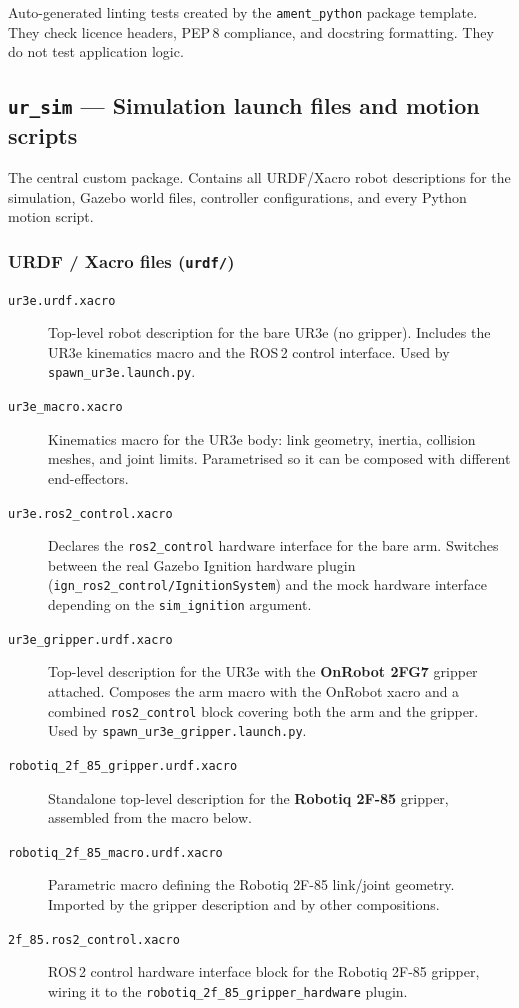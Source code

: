 \documentclass[11pt,a4paper]{article}
\newcommand{\file}[1]{\texttt{#1}}
\begin{document}
Auto-generated linting tests created by the \texttt{ament\_python} package
template. They check licence headers, PEP\,8 compliance, and docstring
formatting. They do not test application logic.

\subsection{\texttt{ur\_sim} --- Simulation launch files and motion scripts}

The central custom package. Contains all URDF/Xacro robot descriptions for
the simulation, Gazebo world files, controller configurations, and every
Python motion script.

\subsubsection{URDF / Xacro files (\file{urdf/})}

\begin{description}
  \item[\file{ur3e.urdf.xacro}]
    Top-level robot description for the bare UR3e (no gripper). Includes
    the UR3e kinematics macro and the ROS\,2 control interface. Used by
    \file{spawn\_ur3e.launch.py}.

  \item[\file{ur3e\_macro.xacro}]
    Kinematics macro for the UR3e body: link geometry, inertia, collision
    meshes, and joint limits. Parametrised so it can be composed with
    different end-effectors.

  \item[\file{ur3e.ros2\_control.xacro}]
    Declares the \texttt{ros2\_control} hardware interface for the bare arm.
    Switches between the real Gazebo Ignition hardware plugin
    (\texttt{ign\_ros2\_control/IgnitionSystem}) and the mock hardware
    interface depending on the \texttt{sim\_ignition} argument.

  \item[\file{ur3e\_gripper.urdf.xacro}]
    Top-level description for the UR3e with the \textbf{OnRobot 2FG7} gripper
    attached. Composes the arm macro with the OnRobot xacro and a combined
    \texttt{ros2\_control} block covering both the arm and the gripper.
    Used by \file{spawn\_ur3e\_gripper.launch.py}.

  \item[\file{robotiq\_2f\_85\_gripper.urdf.xacro}]
    Standalone top-level description for the \textbf{Robotiq 2F-85} gripper,
    assembled from the macro below.

  \item[\file{robotiq\_2f\_85\_macro.urdf.xacro}]
    Parametric macro defining the Robotiq 2F-85 link/joint geometry.
    Imported by the gripper description and by other compositions.

  \item[\file{2f\_85.ros2\_control.xacro}]
    ROS\,2 control hardware interface block for the Robotiq 2F-85 gripper,
    wiring it to the \texttt{robotiq\_2f\_85\_gripper\_hardware} plugin.
\end{description}
\end{document}
